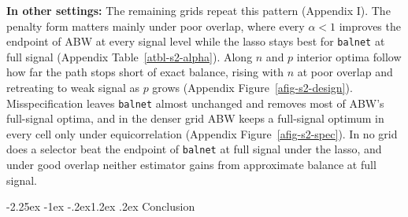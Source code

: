 \documentclass[
  12pt,
  a4paper,
]{article}
\makeatletter
\renewcommand\section{\@startsection{section}{1}{\z@}%
  {-2.25ex \@plus -1ex \@minus -.2ex}{1.2ex \@plus .2ex}%
  {\normalfont\Large\bfseries}}
\makeatother
\begin{document}
\textbf{In other settings:} The remaining grids repeat this pattern
(Appendix I). The penalty form matters mainly under poor overlap, where
every \(\alpha < 1\) improves the endpoint of ABW at every signal level
while the lasso stays best for \texttt{balnet} at full signal
(Appendix Table~\ref{atbl-s2-alpha}). Along \(n\) and \(p\) interior
optima follow how far the path stops short of exact balance, rising with
\(n\) at poor overlap and retreating to weak signal as \(p\) grows
(Appendix Figure~\ref{afig-s2-design}). Misspecification leaves
\texttt{balnet} almost unchanged and removes most of ABW's full-signal
optima, and in the denser grid ABW keeps a full-signal optimum in every
cell only under equicorrelation (Appendix Figure~\ref{afig-s2-spec}). In
no grid does a selector beat the endpoint of \texttt{balnet} at full
signal under the lasso, and under good overlap neither estimator gains
from approximate balance at full signal.

\section{Conclusion}\label{conclusion}

\begin{table}[!htbp]

\caption{\label{tbl-concl}\(\bar R(\Theta)\) of A against B over every
cell of each Study 1 grid, both specifications.}


\end{table}%
\end{document}
